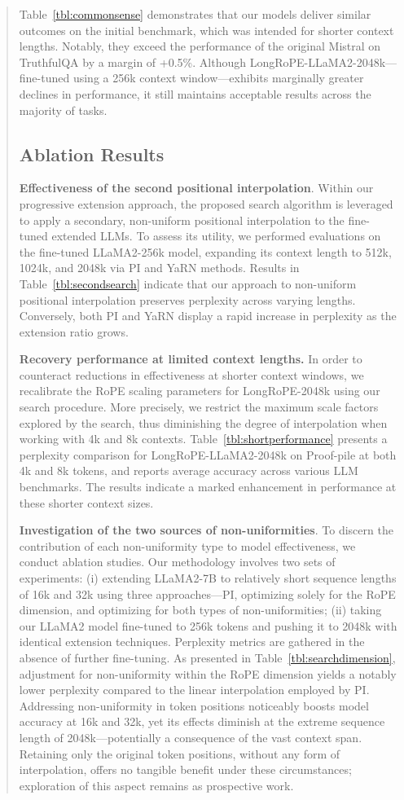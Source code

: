 \begin{abstract}
Table~\ref{tbl:commonsense} demonstrates that our models deliver similar outcomes on the initial benchmark, which was intended for shorter context lengths. Notably, they exceed the performance of the original Mistral on TruthfulQA by a margin of +0.5\%. Although LongRoPE-LLaMA2-2048k—fine-tuned using a 256k context window—exhibits marginally greater declines in performance, it still maintains acceptable results across the majority of tasks.

\subsection{Ablation Results}

\textbf{Effectiveness of the second positional interpolation}. Within our progressive extension approach, the proposed search algorithm is leveraged to apply a secondary, non-uniform positional interpolation to the fine-tuned extended LLMs. To assess its utility, we performed evaluations on the fine-tuned LLaMA2-256k model, expanding its context length to 512k, 1024k, and 2048k via PI and YaRN methods. Results in Table~\ref{tbl:secondsearch} indicate that our approach to non-uniform positional interpolation preserves perplexity across varying lengths. Conversely, both PI and YaRN display a rapid increase in perplexity as the extension ratio grows.

\textbf{Recovery performance at limited context lengths.} In order to counteract reductions in effectiveness at shorter context windows, we recalibrate the RoPE scaling parameters for LongRoPE-2048k using our search procedure. More precisely, we restrict the maximum scale factors explored by the search, thus diminishing the degree of interpolation when working with 4k and 8k contexts. Table~\ref{tbl:shortperformance} presents a perplexity comparison for LongRoPE-LLaMA2-2048k on Proof-pile at both 4k and 8k tokens, and reports average accuracy across various LLM benchmarks. The results indicate a marked enhancement in performance at these shorter context sizes.

\textbf{Investigation of the two sources of non-uniformities}. To discern the contribution of each non-uniformity type to model effectiveness, we conduct ablation studies. Our methodology involves two sets of experiments: (i) extending LLaMA2-7B to relatively short sequence lengths of 16k and 32k using three approaches—PI, optimizing solely for the RoPE dimension, and optimizing for both types of non-uniformities; (ii) taking our LLaMA2 model fine-tuned to 256k tokens and pushing it to 2048k with identical extension techniques. Perplexity metrics are gathered in the absence of further fine-tuning. As presented in Table~\ref{tbl:searchdimension}, adjustment for non-uniformity within the RoPE dimension yields a notably lower perplexity compared to the linear interpolation employed by PI. Addressing non-uniformity in token positions noticeably boosts model accuracy at 16k and 32k, yet its effects diminish at the extreme sequence length of 2048k—potentially a consequence of the vast context span. Retaining only the original token positions, without any form of interpolation, offers no tangible benefit under these circumstances; exploration of this aspect remains as prospective work.


\end{abstract}
